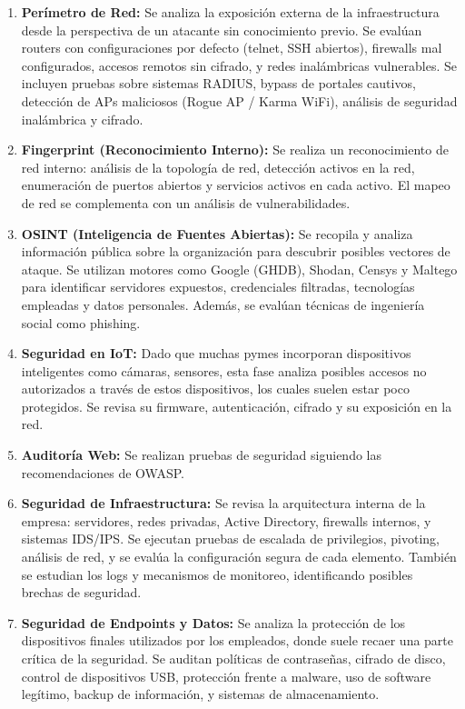 \documentclass[a4paper, 11pt]{article}
\begin{document}
\begin{enumerate}
    \item \textbf{Perímetro de Red:} Se analiza la exposición externa de la infraestructura desde la perspectiva de un atacante sin conocimiento previo. Se evalúan routers con configuraciones por defecto (telnet, SSH abiertos), firewalls mal configurados, accesos remotos sin cifrado, y redes inalámbricas vulnerables. Se incluyen pruebas sobre sistemas RADIUS, bypass de portales cautivos, detección de APs maliciosos (Rogue AP / Karma WiFi), análisis de seguridad inalámbrica y cifrado.

\item \textbf{Fingerprint (Reconocimiento Interno):} Se realiza un reconocimiento de red interno: análisis de la topología de red, detección activos en la red, enumeración de puertos abiertos y servicios activos en cada activo. 
El mapeo de red se complementa con un análisis de vulnerabilidades.

\item \textbf{OSINT (Inteligencia de Fuentes Abiertas):} Se recopila y analiza información pública sobre la organización para descubrir posibles vectores de ataque. Se utilizan motores como Google (GHDB), Shodan, Censys y Maltego para identificar servidores expuestos, credenciales filtradas, tecnologías empleadas y datos personales. Además, se evalúan técnicas de ingeniería social como phishing.

\item \textbf{Seguridad en IoT:} Dado que muchas pymes incorporan dispositivos inteligentes como cámaras, sensores, esta fase analiza posibles accesos no autorizados a través de estos dispositivos, los cuales suelen estar poco protegidos. Se revisa su firmware, autenticación, cifrado y su exposición en la red.
\item \textbf{Auditoría Web:} Se realizan pruebas de seguridad siguiendo las recomendaciones de OWASP. 

\item \textbf{Seguridad de Infraestructura:} Se revisa la arquitectura interna de la empresa: servidores, redes privadas, Active Directory, firewalls internos, y sistemas IDS/IPS. Se ejecutan pruebas de escalada de privilegios, pivoting, análisis de red, y se evalúa la configuración segura de cada elemento. También se estudian los logs y mecanismos de monitoreo, identificando posibles brechas de seguridad.

\item \textbf{Seguridad de Endpoints y Datos:} Se analiza la protección de los dispositivos finales utilizados por los empleados, donde suele recaer una parte crítica de la seguridad. Se auditan políticas de contraseñas, cifrado de disco, control de dispositivos USB, protección frente a malware, uso de software legítimo, backup de información, y sistemas de almacenamiento.

\end{enumerate}
\end{document}
